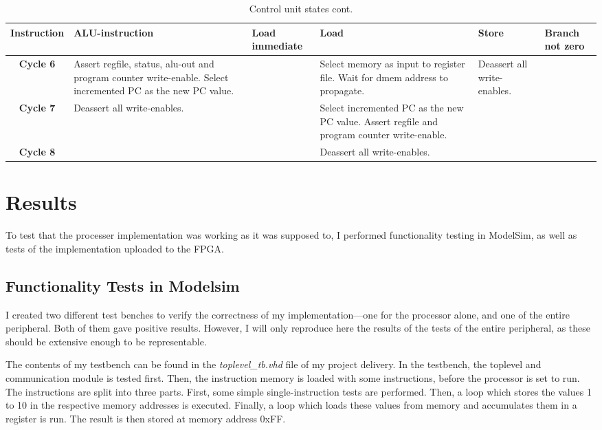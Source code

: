 \documentclass[11pt]{article}
\begin{document}
\begin{table}[htbp]
  \centering
  \begin{tabular}{|c|p{50pt}|p{50pt}|p{50pt}|p{50pt}|p{50pt}|}
    \hline
    {\bf Instruction} & {\bf ALU-instruction} & {\bf Load immediate} & {\bf Load} & {\bf Store} & {\bf Branch not zero} \\ \hline
    {\bf Cycle 6} & Assert regfile, status, alu-out and program counter write-enable. Select incremented PC as the new PC value. &  & Select memory as input to register file. Wait for dmem address to propagate.  & Deassert all write-enables.  & \\ \hline
    {\bf Cycle 7} & Deassert all write-enables. &  & Select incremented PC as the new PC value. Assert regfile and program counter write-enable. &  &  \\ \hline
    {\bf Cycle 8} &  &  & Deassert all write-enables. &  &  \\ \hline
  \end{tabular}
  \caption{Control unit states cont.}
  \label{tab:controlUnitStatesCont}
\end{table}

\section{Results}
\label{sec:results}
To test that the processer implementation was working as it was
supposed to, I performed functionality testing in ModelSim, as well as
tests of the implementation uploaded to the FPGA.
\subsection{Functionality Tests in Modelsim}
\label{subsec:functestsim}
I created two different test benches to verify the correctness of my
implementation---one for the processor alone, and one of the entire
peripheral. Both of them gave positive results. However, I will only
reproduce here the results of the tests of the entire peripheral, as
these should be extensive enough to be representable.

The contents of my testbench can be found in the {\em
  toplevel\_tb.vhd} file of my project delivery. In the testbench, the
toplevel and communication module is tested first. Then, the
instruction memory is loaded with some instructions, before the
processor is set to run. The instructions are split into three
parts. First, some simple single-instruction tests are
performed. Then, a loop which stores the values 1 to 10 in the
respective memory addresses is executed. Finally, a loop which loads
these values from memory and accumulates them in a register is
run. The result is then stored at memory address 0xFF.
\end{document}
